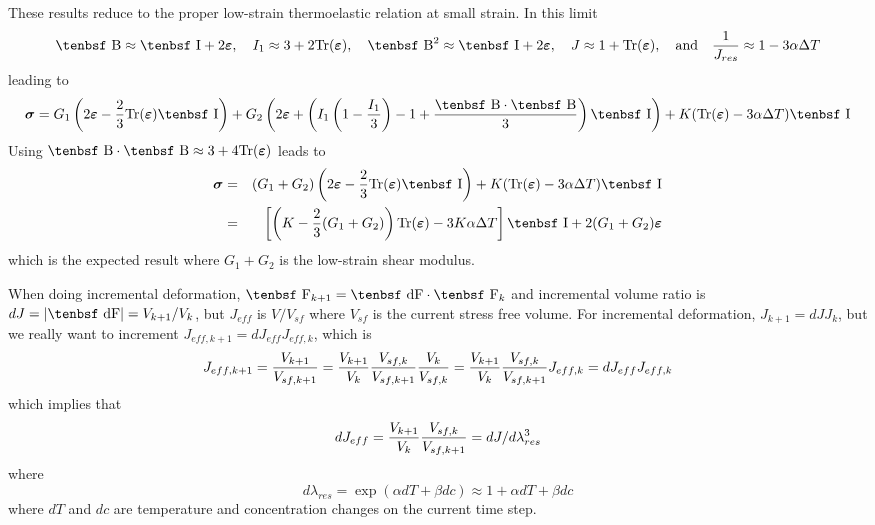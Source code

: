 \documentclass[11pt]{book}
\newcommand{\tens}[1]{\boldsymbol{\mathsf{#1}}}
\def\B{\hbox{\tenbsf B}}
\def\F{\hbox{\tenbsf F}}
\def\dF{\hbox{\tenbsf dF}}
\def\I{\hbox{\tenbsf I}}
\def\Jres{J_{res}}
\begin{document}
These results reduce to the proper low-strain thermoelastic relation at small strain. In this limit
\begin{equation}
   \B \approx \I + 2\tens{\varepsilon}, \quad I_1 \approx 3 + 2{\rm Tr}(\tens\varepsilon), 
         \quad \B^2\approx \I + 2\tens\varepsilon, \quad J \approx 1 + {\rm Tr}(\tens\varepsilon), \quad {\rm and}
         \quad {1\over\Jres} \approx 1-3\alpha\Delta T 
\end{equation}
leading to
\begin{equation}
     \tens\sigma =G_1\left(2\tens{\varepsilon} - {2\over3}{\rm Tr}(\tens\varepsilon)\I\right)
                 +  G_2\left(2\tens{\varepsilon} 
                      + \left(I_1\left(1-{I_1\over3}\right)-1+{\B\cdot\B\over3}\right)\I\right) 
                       + K({\rm Tr}(\tens\varepsilon)-3\alpha\Delta T) \I
\end{equation}
Using $\B\cdot\B \approx 3 + 4{\rm Tr}(\tens\varepsilon)$ leads to
\begin{eqnarray}
     \tens\sigma & = & (G_1+G_2)\left(2\tens{\varepsilon} - {2\over3}{\rm Tr}(\tens\varepsilon)\I\right)
                       + K({\rm Tr}(\tens\varepsilon)-3\alpha\Delta T)\I   \\
         & = &   \left[\left(K-{2\over3}(G_1+G_2)\right){\rm Tr}(\tens\varepsilon) - 3K\alpha\Delta T\right]\I
                        + 2(G_1+G_2)\tens{\varepsilon}
\end{eqnarray}
which is the expected result where $G_1+G_2$ is the low-strain shear modulus.


When doing incremental deformation, $\F_{k+1} = \dF\cdot\F_k$ and incremental volume ratio is $dJ = |\dF| = V_{k+1}/ V_k$, but $J_{eff}$ is $V/V_{sf}$ where $V_{sf}$ is the current stress free volume. For incremental deformation, $J_{k+1} = dJ J_k$, but we really want to increment $J_{eff,k+1} = dJ_{eff}J_{eff,k}$, which is\begin{equation}
     J_{eff,k+1} = {V_{k+1}\over V_{sf,k+1}} = {V_{k+1}\over V_{k}}{V_{sf,k}\over V_{sf,k+1}} {V_{k}\over V_{sf,k}}
             = {V_{k+1}\over V_{k}}{V_{sf,k}\over V_{sf,k+1}} J_{eff,k} = dJ_{eff}J_{eff,k}
\end{equation}
which implies that
\begin{equation}
      dJ_{eff} = {V_{k+1}\over V_{k}}{V_{sf,k}\over V_{sf,k+1}} = dJ/d\lambda_{res}^3
\end{equation}
where
\begin{equation}
    d\lambda_{res} = \exp(\alpha dT + \beta dc) \approx 1 + \alpha dT + \beta dc
\end{equation}
where $dT$ and $dc$ are temperature and concentration changes on the current time step.
\end{document}
